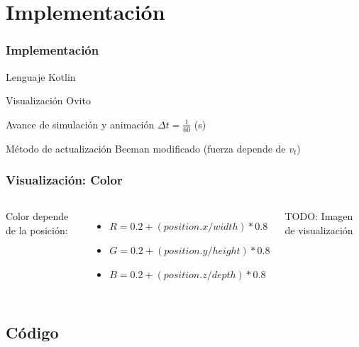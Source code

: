 \documentclass{beamer}
\begin{document}
    \begin{frame}
        \frametitle{Regla: Frontera}
        \begin{center}
        \texttt{[image: \{../imgs/algo\_boundary]}.png}
        \end{center}
    \end{frame}

    \section{Implementación}
        \begin{frame}
            \frametitle{Implementación}
            \begin{block}{Lenguaje}
                Kotlin
            \end{block}
            \begin{block}{Visualización}
                Ovito
            \end{block}
            \begin{block}{Avance de simulación y animación}
                $\Delta t = \frac{1}{60}$ (s)
            \end{block}

            \begin{block}{Método de actualización}
                Beeman modificado (fuerza depende de $v_t$)
            \end{block}
        \end{frame}

        \begin{frame}
            \frametitle{Visualización: Color}
            \begin{columns}
                Color depende de la posición:
                \begin{itemize}
                    \item $R = 0.2 + (position.x / width) * 0.8$
                    \item $G = 0.2 + (position.y / height) * 0.8$
                    \item $B = 0.2 + (position.z / depth) * 0.8$
                \end{itemize}
                    TODO: Imagen de visualización
            \end{columns}
        \end{frame}


        \subsection{Código}
\end{document}
